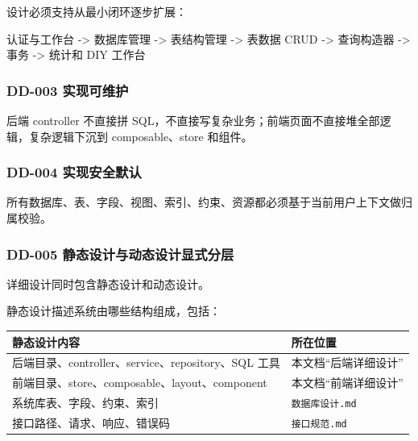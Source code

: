\documentclass[
  a4paper,
  UTF8]{ctexart}
\newenvironment{Shaded}{}{}
\newcommand{\NormalTok}[1]{#1}
\begin{document}
设计必须支持从最小闭环逐步扩展：

\begin{Shaded}
\begin{Highlighting}[]
\NormalTok{认证与工作台}
\NormalTok{  {-}\textgreater{} 数据库管理}
\NormalTok{  {-}\textgreater{} 表结构管理}
\NormalTok{  {-}\textgreater{} 表数据 CRUD}
\NormalTok{  {-}\textgreater{} 查询构造器}
\NormalTok{  {-}\textgreater{} 事务}
\NormalTok{  {-}\textgreater{} 统计和 DIY 工作台}
\end{Highlighting}
\end{Shaded}

\hypertarget{dd-003-ux5b9eux73b0ux53efux7ef4ux62a4}{%
\subsubsection{DD-003
实现可维护}\label{dd-003-ux5b9eux73b0ux53efux7ef4ux62a4}}

后端 controller 不直接拼
SQL，不直接写复杂业务；前端页面不直接堆全部逻辑，复杂逻辑下沉到
composable、store 和组件。

\hypertarget{dd-004-ux5b9eux73b0ux5b89ux5168ux9ed8ux8ba4}{%
\subsubsection{DD-004
实现安全默认}\label{dd-004-ux5b9eux73b0ux5b89ux5168ux9ed8ux8ba4}}

所有数据库、表、字段、视图、索引、约束、资源都必须基于当前用户上下文做归属校验。

\hypertarget{dd-005-ux9759ux6001ux8bbeux8ba1ux4e0eux52a8ux6001ux8bbeux8ba1ux663eux5f0fux5206ux5c42}{%
\subsubsection{DD-005
静态设计与动态设计显式分层}\label{dd-005-ux9759ux6001ux8bbeux8ba1ux4e0eux52a8ux6001ux8bbeux8ba1ux663eux5f0fux5206ux5c42}}

详细设计同时包含静态设计和动态设计。

静态设计描述系统由哪些结构组成，包括：

\begin{longtable}[]{@{}ll@{}}
\toprule
静态设计内容 & 所在位置 \\
\midrule
\endhead
后端目录、controller、service、repository、SQL 工具 &
本文档``后端详细设计'' \\
前端目录、store、composable、layout、component &
本文档``前端详细设计'' \\
系统库表、字段、约束、索引 & \texttt{数据库设计.md} \\
接口路径、请求、响应、错误码 & \texttt{接口规范.md} \\
\bottomrule
\end{longtable}
\end{document}
